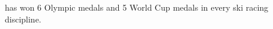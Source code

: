\documentclass{article}
\begin{document}
 has won 6 Olympic medals and 5 World Cup medals in every ski racing discipline.
\end{document}
